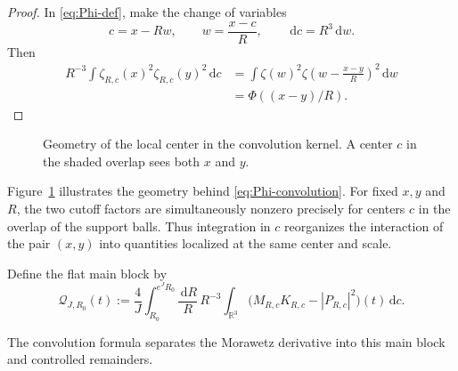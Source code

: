 \documentclass{interact}
\numberwithin{equation}{section}
\theoremstyle{plain}
\theoremstyle{definition}
\theoremstyle{remark}
\newcommand{\R}{\mathbb R}
\newcommand{\dd}{\,\mathrm d}
\begin{document}
\begin{proof}
In \eqref{eq:Phi-def}, make the change of variables
\[
 c=x-Rw,
 \qquad
 w=\frac{x-c}{R},
 \qquad
 \dd c=R^3\dd w.
\]
Then
\begin{align*}
 R^{-3}\int\zeta_{R,c}(x)^2\zeta_{R,c}(y)^2\dd c
 &=\int\zeta(w)^2
 \zeta\left(w-\frac{x-y}{R}\right)^2\dd w\\
 &=\Phi((x-y)/R).
\end{align*}
\end{proof}

\begin{figure}[htbp]
\centering
{}
\caption{Geometry of the local center in the convolution kernel. A center $c$ in the shaded overlap sees both $x$ and $y$.}
\label{fig:convolution-geometry}
\end{figure}

Figure~\ref{fig:convolution-geometry} illustrates the geometry behind \eqref{eq:Phi-convolution}. For fixed $x,y$ and $R$, the two cutoff factors are simultaneously nonzero precisely for centers $c$ in the overlap of the support balls. Thus integration in $c$ reorganizes the interaction of the pair $(x,y)$ into quantities localized at the same center and scale.

Define the flat main block by
\begin{equation}\label{eq:Q-def}
 \mathcal Q_{J,R_0}(t)
 :=\frac4J\int_{R_0}^{e^JR_0}\frac{\dd R}{R}\,R^{-3}
 \int_{\R^3}
 \bigl(M_{R,c}K_{R,c}-|P_{R,c}|^2\bigr)(t)\dd c.
\end{equation}

The convolution formula separates the Morawetz derivative into this main block and controlled remainders.
\end{document}
